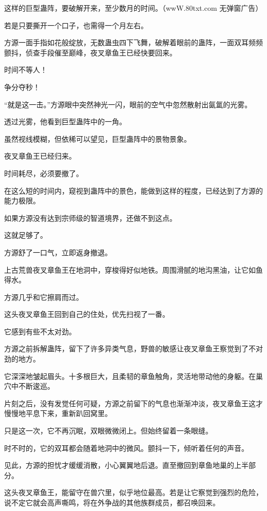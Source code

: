 
\begin{this_body}

这样的巨型蛊阵，要破解开来，至少数月的时间。（wwW.80txt.com 无弹窗广告）

若是只要撕开一个口子，也需得一个月左右。

方源一面手指如花般绽放，无数蛊虫四下飞舞，破解着眼前的蛊阵，一面双耳频频颤抖，侦查手段催至巅峰，夜叉章鱼王已经快要回来。

时间不等人！

争分夺秒！

“就是这一击。”方源眼中突然神光一闪，眼前的空气中忽然散射出氤氲的光雾。

透过光雾，他看到巨型蛊阵中的一角。

虽然视线模糊，但依稀可以望见，巨型蛊阵中的景物景象。

夜叉章鱼王已经归来。

时间耗尽，必须要撤了。

在这么短的时间内，窥视到蛊阵中的景色，能做到这样的程度，已经达到了方源的能力极限。

如果方源没有达到宗师级的智道境界，还做不到这点。

这就足够了。

方源舒了一口气，立即返身撤退。

上古荒兽夜叉章鱼王在地洞中，穿梭得好似地铁。周围滑腻的地沟黑油，让它如鱼得水。

方源几乎和它擦肩而过。

这头夜叉章鱼王回到自己的住处，优先扫视了一番。

它感到有些不太对劲。

方源之前拆解蛊阵，留下了许多异类气息，野兽的敏感让夜叉章鱼王察觉到了不对劲的地方。

它深深地皱起眉头。十多根巨大，且柔韧的章鱼触角，灵活地带动他的身躯。在巢穴中不断逡巡。

片刻之后，没有发觉任何可疑，方源之前留下的气息也渐渐冲淡，夜叉章鱼王这才慢慢地平息下来，重新趴回窝里。

只是这一次，它不再沉眠，双眼微微闭上。但始终留着一条眼缝。

时不时的，它的双耳都会随着地洞中的微风。颤抖一下，倾听着任何的声音。

见此，方源的担忧才缓缓消散，小心翼翼地后退。直至撤回到章鱼地巢的上半部分。

这头夜叉章鱼王，能留守在兽穴里，似乎地位最高。若是让它察觉到强烈的危险，说不定它就会高声嘶鸣，将在外争战的其他族群成员，都召唤回来。


\end{this_body}
